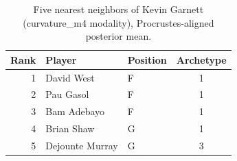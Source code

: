 \begin{table}[htbp]
  \centering\small
  \begin{tabular}{rllc}
    \toprule
    Rank & Player & Position & Archetype \\
    \midrule
    1 & David West & F & 1 \\
    2 & Pau Gasol & F & 1 \\
    3 & Bam Adebayo & F & 1 \\
    4 & Brian Shaw & G & 1 \\
    5 & Dejounte Murray & G & 3 \\
    \bottomrule
  \end{tabular}
  \caption{Five nearest neighbors of Kevin Garnett (curvature_m4 modality), Procrustes-aligned posterior mean.}
  \label{tab:Kevin_Garnett_neighbors_curvature_m4}
\end{table}

